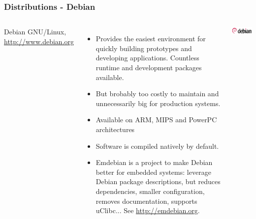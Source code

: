 \begin{frame}
  \frametitle{Distributions - Debian}
  \small
  \begin{columns}[T]
    Debian GNU/Linux, \url{http://www.debian.org}
    \begin{itemize}
    \item Provides the easiest environment for quickly building prototypes
          and developing applications. Countless runtime and
          development packages available.
    \item But brobably too costly to maintain
          and unnecessarily big for production systems.
    \item Available on ARM, MIPS and PowerPC architectures
    \item Software is compiled natively by default.
    \item Emdebian is a project to make Debian better for embedded
      systems: leverage Debian package descriptions, but reduces
      dependencies, smaller configuration, removes documentation,
      supports uClibc... See \url{http://emdebian.org}.
    \end{itemize}
    \includegraphics[width=\textwidth]{slides/sysdev-embedded-linux/debian.png}\\
  \end{columns}
\end{frame}

